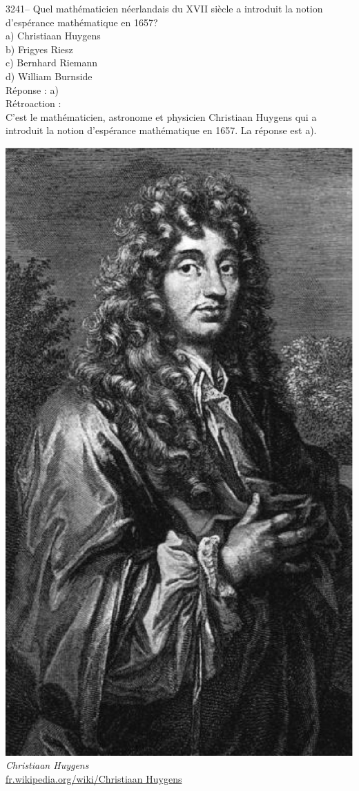 \documentclass[letterpaper, 12pt]{article}
\begin{document}
3241-- Quel math\'ematicien n\'eerlandais du {\scriptsize XVII\ieme{}} si\`ecle a introduit la notion d'esp\'erance math\'ematique en 1657?\\

a) Christiaan Huygens\\
b) Frigyes Riesz\\
c) Bernhard Riemann\\
d) William Burnside\\

R\'eponse : a)\\

R\'etroaction :\\
C'est le math\'ematicien, astronome et physicien Christiaan Huygens qui a introduit la notion d'esp\'erance math\'ematique en 1657. La r\'eponse est a).
\begin{center}
\includegraphics[scale=0.23]{huygens.eps}\\
\emph{{\small Christiaan Huygens}}\\
\href{http://fr.wikipedia.org/wiki/Christiaan_Huygens}{fr.wikipedia.org/wiki/Christiaan Huygens}\\[5mm]
\end{center}
\end{document}
